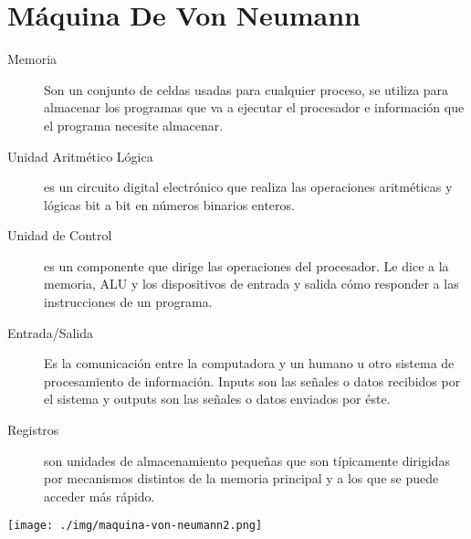 \documentclass[12pt]{article}
\begin{document}
\section{Máquina De Von Neumann}
\label{sec:org9b4b761}
\begin{description}
\item[{Memoria}] Son un conjunto de celdas usadas para cualquier proceso, se utiliza para almacenar los programas que va a ejecutar el procesador e información que el programa necesite almacenar.

\item[{Unidad Aritmético Lógica}] es un circuito digital electrónico que realiza las operaciones aritméticas y lógicas bit a bit en números binarios enteros.

\item[{Unidad de Control}] es un componente que dirige las operaciones del procesador. Le dice a la memoria, ALU y los dispositivos de entrada y salida cómo responder a las instrucciones de un programa.

\item[{Entrada/Salida}] Es la comunicación entre la computadora y un humano u otro sistema de procesamiento de información. Inputs son las señales o datos recibidos por el sistema y outputs son las señales o datos enviados por éste.

\item[{Registros}] son unidades de almacenamiento pequeñas que son típicamente dirigidas por mecanismos distintos de la memoria principal y a los que se puede acceder más rápido.
\end{description}

\begin{center}
\texttt{[image: ./img/maquina-von-neumann2.png]}
\end{center}
\end{document}
